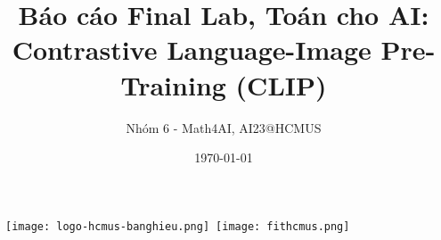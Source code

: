 \documentclass[10pt,aspectratio=169]{beamer}
\title[Math4AI - Final Lab: CLIP]{Báo cáo Final Lab, Toán cho AI:\\ Contrastive Language-Image Pre-Training (CLIP)}
\author{Nhóm 6 - Math4AI, AI23@HCMUS} %
\institute[] %
{
\begin{columns}[T]
    \begin{column}{.3\pdfpagewidth}
        \textbf{Sinh viên thực hiện:}\\[0.2cm]
        \noindent
        Nguyễn Đình Hà Dương (23122002) \\ 
        Nguyễn Lê Hoàng Trung (23122004) \\
        Đinh Đức Tài (23122013) \\
        Hoàng Minh Trung (23122014) \\---\\
        
        \noindent AI23@HCMUS, VNUHCM
    \end{column}
    \begin{column}{.3\textwidth}
        \textbf{Giáo viên hướng dẫn:}\\[0.2cm] 
        \noindent
        TS. Cấn Trần Thành Trung \\
        ThS. Nguyễn Ngọc Toàn \\
        ThS. Trần Hà Sơn \\
        ---\\ FIT@HCMUS, VNUHCM
    \end{column}
\end{columns}
}
\date{\dmydate\today} %
\begin{document}
{
  \begin{frame}
    \titlepage
    \vspace{-0.8cm}
    \hfill
    \hbox{
      \texttt{[image: logo-hcmus-banghieu.png]}
      \texttt{[image: fithcmus.png]}
    }
  \end{frame}
}






% 
\end{document}
